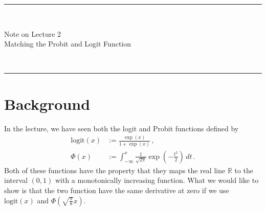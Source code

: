 \documentclass[a4paper]{article}
\begin{document}
\fancyhead[C]{}
\hrule \medskip
\begin{minipage}{0.295\textwidth}
    \raggedright
    \hfill\\
\end{minipage}
\begin{minipage}{0.4\textwidth}
    \centering
    \large
    Note on Lecture 2\\
    \normalsize
    Matching the Probit and Logit Function\\
\end{minipage}
\begin{minipage}{0.295\textwidth}
    \raggedleft
    \hfill\\
\end{minipage}
\medskip\hrule
\bigskip


\section*{Background}
In the lecture, we have seen both the logit and Probit functions defined by
\begin{align}
    \mathrm{logit}(x) & := \frac{\exp(x)}{1+\exp(x)} \,, \label{eq:logit} \\
    \Phi(x) & := \int_{-\infty}^x \frac{1}{\sqrt{2\pi}} \exp\left(-\frac{t^2}{2}\right)\, dt \label{eq:probit} \,. 
\end{align}
Both of these functions have the property that they maps the real line $\mathbb{R}$ to the interval $(0,1)$ with a monotonically increasing function. What we would like to show is that the two function have the same derivative at zero if we use $\mathrm{logit}(x)$ and $\Phi\left(\sqrt{\frac{\pi}{8}}x\right)$.
\end{document}
